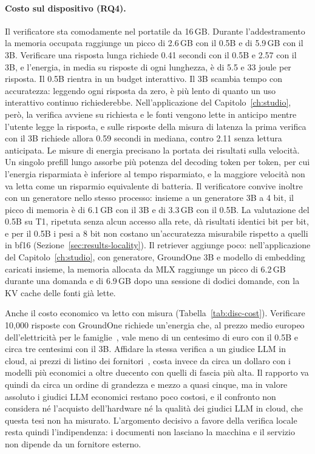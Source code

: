 \paragraph{Costo sul dispositivo (RQ4).} Il verificatore sta comodamente nel portatile da 16\,GB. Durante
l'addestramento la memoria occupata raggiunge un picco di 2.6\,GB con il 0.5B e di 5.9\,GB con il 3B. Verificare una risposta lunga richiede 0.41 secondi con il 0.5B e 2.57 con il 3B, e l'energia, in media su risposte di ogni lunghezza, è di 5.5 e 33 joule per risposta. Il 0.5B rientra in un budget interattivo. Il 3B scambia tempo con accuratezza: leggendo ogni risposta da zero, è più lento di quanto un uso interattivo continuo richiederebbe. Nell'applicazione del Capitolo~\ref{ch:studio}, però, la verifica avviene su richiesta e le fonti vengono lette in anticipo mentre l'utente legge la risposta, e sulle risposte della misura di latenza la prima verifica con il 3B richiede allora 0.59 secondi in mediana, contro 2.11 senza lettura anticipata. Le misure di energia precisano la portata dei risultati sulla velocità. Un singolo
prefill lungo assorbe più potenza del decoding token per token, per cui l'energia risparmiata è inferiore al tempo
risparmiato, e la maggiore velocità non va letta come un risparmio equivalente di batteria. Il verificatore convive
inoltre con un generatore nello stesso processo: insieme a un generatore 3B a 4 bit, il picco di memoria è di 6.1\,GB con
il 3B e di 3.3\,GB con il 0.5B. La valutazione del 0.5B su T1, ripetuta senza alcun accesso alla rete, dà risultati identici bit per bit, e per il 0.5B i pesi a 8 bit non costano un'accuratezza misurabile rispetto a quelli in bf16 (Sezione~\ref{sec:results-locality}). Il
retriever aggiunge poco: nell'applicazione del Capitolo~\ref{ch:studio}, con generatore, GroundOne 3B e modello di
embedding caricati insieme, la memoria allocata da MLX raggiunge un picco di 6.2\,GB durante una domanda e di 6.9\,GB dopo una sessione di dodici domande, con la KV cache delle fonti già lette.

Anche il costo economico va letto con misura (Tabella~\ref{tab:disc-cost}). Verificare 10{,}000 risposte con
GroundOne richiede un'energia che, al prezzo medio europeo dell'elettricità per le famiglie~\cite{eurostat2026electricity},
vale meno di un centesimo di euro con il 0.5B e circa tre centesimi con il 3B. Affidare la stessa verifica a un giudice LLM
in cloud, ai prezzi di listino dei fornitori~\cite{anthropic2026pricing,openai2026pricing,google2026geminipricing},
costa invece da circa un dollaro con i modelli più economici a oltre duecento con quelli di fascia più alta. Il rapporto va quindi da circa un ordine di grandezza e mezzo a quasi cinque, ma in valore assoluto i giudici LLM economici restano poco costosi, e il
confronto non considera né l'acquisto dell'hardware né la qualità dei giudici LLM in cloud, che questa tesi non ha
misurato. L'argomento decisivo a favore della verifica locale resta quindi l'indipendenza: i documenti non lasciano la
macchina e il servizio non dipende da un fornitore esterno.

